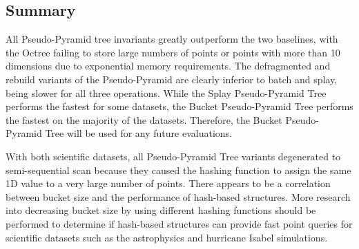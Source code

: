 \subsection{Summary}

All Pseudo-Pyramid tree invariants greatly outperform the two baselines, with the Octree failing to store large numbers of points or points with more than 10 dimensions due to exponential memory requirements. The defragmented and rebuild variants of the Pseudo-Pyramid are clearly inferior to batch and splay, being slower for all three operations. While the Splay Pseudo-Pyramid Tree performs the fastest for some datasets, the Bucket Pseudo-Pyramid Tree performs the fastest on the majority of the datasets. Therefore, the Bucket Pseudo-Pyramid Tree will be used for any future evaluations.

With both scientific datasets, all Pseudo-Pyramid Tree variants degenerated to semi-sequential scan because they caused the hashing function to assign the same 1D value to a very large number of points. There appears to be a correlation between bucket size and the performance of hash-based structures. More research into decreasing bucket size by using different hashing functions should be performed to determine if hash-based structures can provide fast point queries for scientific datasets such as the astrophysics and hurricane Isabel simulations.